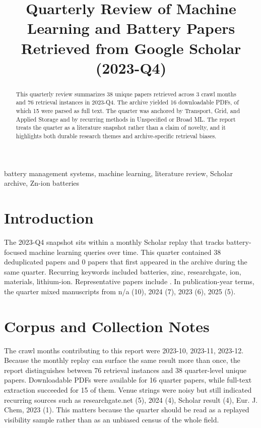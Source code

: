 \documentclass[conference]{IEEEtran}
\begin{document}
\title{ Quarterly Review of Machine Learning and Battery Papers Retrieved from Google Scholar (2023-Q4) }

\author{
}

\maketitle

\begin{abstract}
This quarterly review summarizes 38 unique papers retrieved across 3 crawl months and 76 retrieval instances in 2023-Q4. The archive yielded 16 downloadable PDFs, of which 15 were parsed as full text. The quarter was anchored by Transport, Grid, and Applied Storage and by recurring methods in Unspecified or Broad ML. The report treats the quarter as a literature snapshot rather than a claim of novelty, and it highlights both durable research themes and archive-specific retrieval biases.
\end{abstract}

\begin{IEEEkeywords}
battery management systems, machine learning, literature review, Scholar archive, Zn-ion batteries
\end{IEEEkeywords}

\section{Introduction}
The 2023-Q4 snapshot sits within a monthly Scholar replay that tracks battery-focused machine learning queries over time. This quarter contained 38 deduplicated papers and 0 papers that first appeared in the archive during the same quarter. Recurring keywords included batteries, zinc, researchgate, ion, materials, lithium-ion. Representative papers include \cite{machinelearningdriven2025,recentadvancesin2025,aphysicsinspired2023,datadrivenapproaches2024}. In publication-year terms, the quarter mixed manuscripts from n/a (10), 2024 (7), 2023 (6), 2025 (5).

\section{Corpus and Collection Notes}
The crawl months contributing to this report were 2023-10, 2023-11, 2023-12. Because the monthly replay can surface the same result more than once, the report distinguishes between 76 retrieval instances and 38 quarter-level unique papers. Downloadable PDFs were available for 16 quarter papers, while full-text extraction succeeded for 15 of them. Venue strings were noisy but still indicated recurring sources such as researchgate.net (5), 2024 (4), Scholar result (4), Eur. J. Chem, 2023 (1). This matters because the quarter should be read as a replayed visibility sample rather than as an unbiased census of the whole field.
\end{document}
